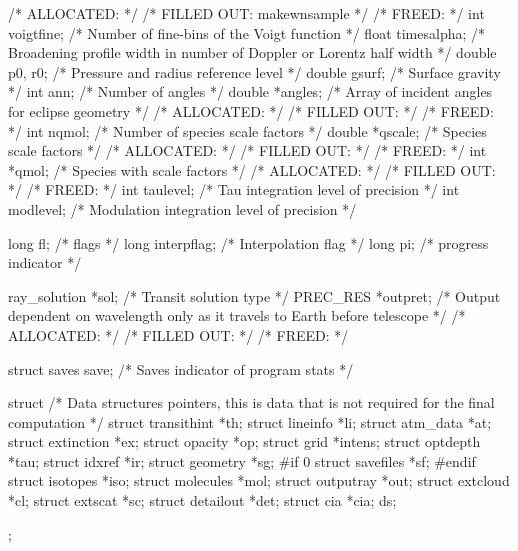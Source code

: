 \documentclass[letterpaper,12pt]{article}
\begin{document}
\begin{plain}
{    /* ALLOCATED:							    */
    /* FILLED OUT:	makewnsample						    */
    /* FREED: 								    */ 
  int voigtfine;     /* Number of fine-bins of the Voigt function           */
  float timesalpha;  /* Broadening profile width in number of Doppler or
                        Lorentz half width                                  */
  double p0, r0;     /* Pressure and radius reference level                 */
  double gsurf;      /* Surface gravity                                     */
  int ann;           /* Number of angles                                    */
  double *angles;    /* Array of incident angles for eclipse geometry       */
    /* ALLOCATED:							    */
    /* FILLED OUT:							    */
    /* FREED: 								    */ 
  int nqmol;         /* Number of species scale factors                     */
  double *qscale;    /* Species scale factors                               */
    /* ALLOCATED:							    */
    /* FILLED OUT:							    */
    /* FREED: 								    */ 
  int *qmol;         /* Species with scale factors                          */
    /* ALLOCATED:							    */
    /* FILLED OUT:							    */
    /* FREED: 								    */ 
  int taulevel;      /* Tau integration level of precision                  */
  int modlevel;      /* Modulation integration level of precision           */

  long fl;           /* flags                                               */
  long interpflag;   /* Interpolation flag                                  */
  long pi;           /* progress indicator                                  */

  ray_solution *sol; /* Transit solution type                               */
  PREC_RES *outpret; /* Output dependent on wavelength only as it travels
                        to Earth before telescope                           */
    /* ALLOCATED:							    */
    /* FILLED OUT:							    */
    /* FREED: 								    */ 

  struct saves save; /* Saves indicator of program stats                    */

  struct {           /* Data structures pointers, this is data that is not
                        required for the final computation                  */
    struct transithint *th;
    struct lineinfo    *li;
    struct atm_data    *at;
    struct extinction  *ex;
    struct opacity     *op;
    struct grid        *intens;
    struct optdepth    *tau;
    struct idxref      *ir;
    struct geometry    *sg;
#if 0
    struct savefiles   *sf;
#endif
    struct isotopes    *iso;
    struct molecules   *mol;
    struct outputray   *out;
    struct extcloud    *cl;
    struct extscat     *sc;
    struct detailout   *det;
    struct cia         *cia;
  }ds;
};
\end{plain}
\end{document}
